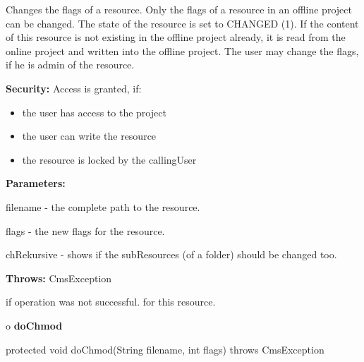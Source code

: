 \begin{description}
\htmlDD Changes the flags of a resource. \htmlBR
Only the flags of a resource in an offline project can be changed. The state
of the resource is set to CHANGED (1). If the content of this resource is not
existing in the offline project already, it is read from the online project
and written into the offline project. The user may change the flags, if he is
admin of the resource.

{\bf Security:} Access is granted, if:

\begin{itemize}
\item the user has access to the project
\item the user can write the resource
\item the resource is locked by the callingUser
\end{itemize}

\begin{description}
\item {\bf Parameters:}

filename - the complete path to the resource.

flags - the new flags for the resource.

chRekursive - shows if the subResources (of a folder) should be changed too.
\item {\bf Throws:} CmsException

if operation was not successful. for this resource.
\end{description}

\end{description}

o {\bf doChmod}

\begin{PRE}
 protected void doChmod(String filename,
                        int flags) throws CmsException
\end{PRE}

